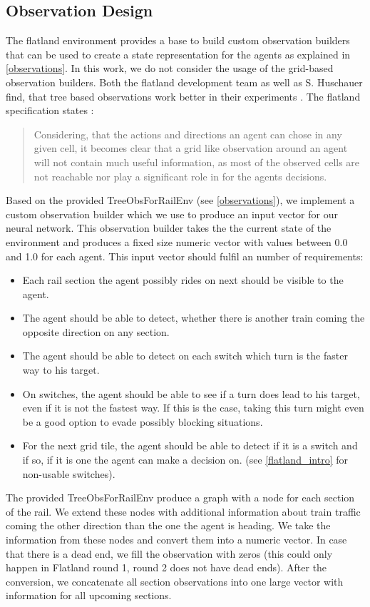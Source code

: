 \subsection*{Observation Design}\label{enhanced_observations}
The flatland environment provides a base to build custom observation builders that can be used to create a state representation for the agents as explained in \autoref{observations}. In this work, we do not consider the usage of the grid-based observation builders.
Both the flatland development team as well as S. Huschauer find, that tree based observations work better in their experiments \cite{flatlandstephan}. The flatland specification states \cite{flatland_spec}:
\begin{quote}
Considering, that the actions and directions an agent can chose in any given cell, it becomes clear that a grid like observation around an agent will not contain much useful information, as most of the observed cells are not reachable nor play a significant role in for the agents decisions.
\end{quote}
Based on the provided TreeObsForRailEnv (see \autoref{observations}), we implement a custom observation builder which we use to produce an input vector for our neural network. This observation builder takes the the current state of the environment and produces a fixed size numeric vector with values between 0.0 and 1.0 for each agent. This input vector should fulfil an number of requirements:
\begin{itemize}
	\item Each rail section the agent possibly rides on next should be visible to the agent.
	\item The agent should be able to detect, whether there is another train coming the opposite direction on any section.
	\item The agent should be able to detect on each switch which turn is the faster way to his target.
	\item On switches, the agent should be able to see if a turn does lead to his target, even if it is not the fastest way. If this is the case, taking this turn might even be a good option to evade possibly blocking situations.
	\item For the next grid tile, the agent should be able to detect if it is a switch and if so, if it is one the agent can make a decision on. (see \autoref{flatland_intro} for non-usable switches).
\end{itemize}
The provided TreeObsForRailEnv produce a graph with a node for each section of the rail. We extend these nodes with additional information about train traffic coming the other direction than the one the agent is heading. We take the information from these nodes and convert them into a numeric vector. In case that there is a dead end, we fill the observation with zeros (this could only happen in Flatland round 1, round 2 does not have dead ends). After the conversion, we concatenate all section observations into one large vector with information for all upcoming sections.\\
